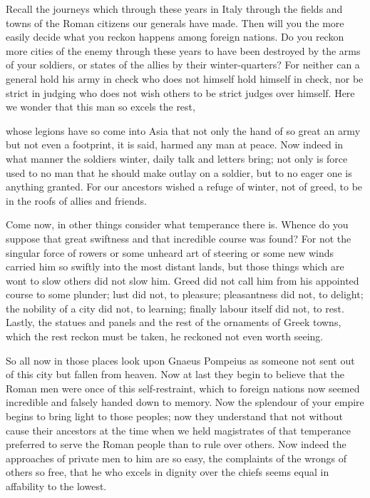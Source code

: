  Recall the journeys which through these years in Italy through the fields and towns of the Roman citizens our generals have made. Then will you the more easily decide what you reckon happens among foreign nations. Do you reckon more cities of the enemy through these years to have been destroyed by the arms of your soldiers, or states of the allies by their winter-quarters? For neither can a general hold his army in check who does not himself hold himself in check, nor be strict in judging who does not wish others to be strict judges over himself. Here we wonder that this man so excels the rest,

 whose legions have so come into Asia that not only the hand of so great an army but not even a footprint, it is said, harmed any man at peace. Now indeed in what manner the soldiers winter, daily talk and letters bring; not only is force used to no man that he should make outlay on a soldier, but to no eager one is anything granted. For our ancestors wished a refuge of winter, not of greed, to be in the roofs of allies and friends.

 Come now, in other things consider what temperance there is. Whence do you suppose that great swiftness and that incredible course was found? For not the singular force of rowers or some unheard art of steering or some new winds carried him so swiftly into the most distant lands, but those things which are wont to slow others did not slow him. Greed did not call him from his appointed course to some plunder; lust did not, to pleasure; pleasantness did not, to delight; the nobility of a city did not, to learning; finally labour itself did not, to rest. Lastly, the statues and panels and the rest of the ornaments of Greek towns, which the rest reckon must be taken, he reckoned not even worth seeing.

 So all now in those places look upon Gnaeus Pompeius as someone not sent out of this city but fallen from heaven. Now at last they begin to believe that the Roman men were once of this self-restraint, which to foreign nations now seemed incredible and falsely handed down to memory. Now the splendour of your empire begins to bring light to those peoples; now they understand that not without cause their ancestors at the time when we held magistrates of that temperance preferred to serve the Roman people than to rule over others. Now indeed the approaches of private men to him are so easy, the complaints of the wrongs of others so free, that he who excels in dignity over the chiefs seems equal in affability to the lowest.


